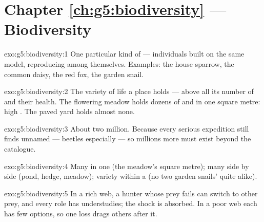 \section*{Chapter \ref{ch:g5:biodiversity} --- Biodiversity}

\begin{solution}{exo:g5:biodiversity:1}
One particular kind of  --- individuals built on
the same model, reproducing among themselves. Examples: the
house sparrow, the common daisy, the red fox, the garden
snail.
\end{solution}

\begin{solution}{exo:g5:biodiversity:2}
The variety of life a place holds --- above all its number of
 and their health. The flowering meadow holds dozens of
 and   in one square metre: high
. The paved yard holds almost none.
\end{solution}

\begin{solution}{exo:g5:biodiversity:3}
About two million. Because every serious expedition still
finds unnamed  --- beetles especially --- so millions
more must exist beyond the catalogue.
\end{solution}

\begin{solution}{exo:g5:biodiversity:4}
Many  in one  (the meadow's square metre); many
 side by side (pond, hedge, meadow); variety within a
 (no two garden snails'  quite alike).
\end{solution}

\begin{solution}{exo:g5:biodiversity:5}
In a rich web, a hunter whose prey fails can switch to other
prey, and every role has understudies; the shock is absorbed.
In a poor web each  has few options, so one loss drags
others after it.
\end{solution}

